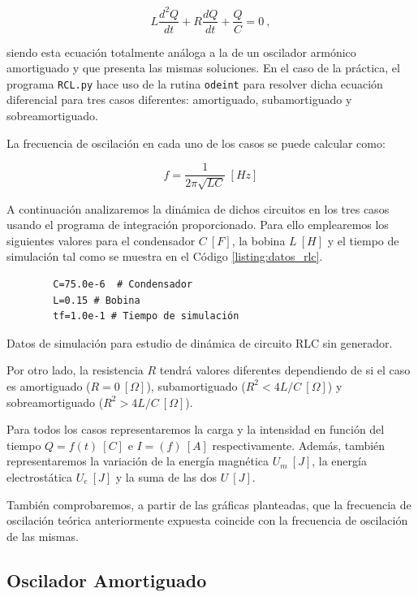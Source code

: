 \documentclass[journal]{IEEEtran}
\newenvironment{code}{\captionsetup{type=listing}}{\par\addvspace{\baselineskip}}
\begin{document}
\begin{equation}
L\frac{d^2Q}{dt} + R\frac{dQ}{dt} + \frac{Q}{C} = 0 ~,
\end{equation}

siendo esta ecuación totalmente análoga a la de un oscilador armónico amortiguado y que presenta las mismas soluciones. En el caso de la práctica, el programa \texttt{RCL.py} hace uso de la rutina \texttt{odeint} para resolver dicha ecuación diferencial para tres casos diferentes: amortiguado, subamortiguado y sobreamortiguado.

La frecuencia de oscilación en cada uno de los casos se puede calcular como:

\begin{equation}
f = \frac{1}{2\pi\sqrt{LC}}~[Hz]
\end{equation}

A continuación analizaremos la dinámica de dichos circuitos en los tres casos usando el programa de integración proporcionado. Para ello emplearemos los siguientes valores para el condensador $C~[F]$, la bobina $L~[H]$ y el tiempo de simulación tal como se muestra en el Código \ref{listing:datos_rlc}.

\bigskip

\begin{code}
    \begin{verbatim}
        C=75.0e-6  # Condensador
        L=0.15 # Bobina
        tf=1.0e-1 # Tiempo de simulación
    \end{verbatim}
    \caption{Datos de simulación para estudio de dinámica de circuito RLC sin generador.}
    \label{listing:datos_rlc}
\end{code}

Por otro lado, la resistencia $R$ tendrá valores diferentes dependiendo de si el caso es amortiguado ($R=0~[\Omega]$), subamortiguado ($R^2 < 4L/C ~ [\Omega]$) y sobreamortiguado ($R^2 > 4L/C ~ [\Omega]$).

Para todos los casos representaremos la carga y la intensidad en función del tiempo $Q = f(t)~[C]$ e $I = (f)~[A]$ respectivamente. Además, también representaremos la variación de la energía magnética $U_m~[J]$, la energía electrostática $U_e~[J]$ y la suma de las dos $U~[J]$.

También comprobaremos, a partir de las gráficas planteadas, que la frecuencia de oscilación teórica anteriormente expuesta coincide con la frecuencia de oscilación de las mismas.

\subsection{Oscilador Amortiguado}
\label{subsec:osciladoramortiguado}
\end{document}
